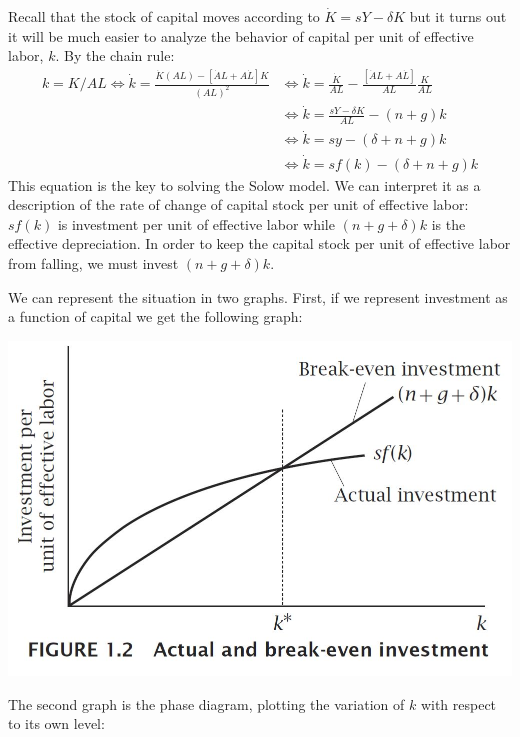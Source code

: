 \documentclass[12pt]{report}
\begin{document}
Recall that the stock of capital moves according to $\dot{K} = sY - \delta K$ but it turns out it will be much easier to analyze the behavior of capital per unit of effective labor, $k$. By the chain rule: \begin{align*} k = K/AL \Leftrightarrow \dot{k} =  \frac{\dot{K}(AL) - [\dot{A}L + A\dot{L}]K}{(AL)^2} & \Leftrightarrow \dot{k}  =  \frac{\dot{K}}{AL} - \frac{[\dot{A}L + A\dot{L}]}{AL}\frac{K}{AL} \\
& \Leftrightarrow \dot{k}  =  \frac{sY - \delta K}{AL} - (n + g)k \\
& \Leftrightarrow \dot{k}  =  sy - (\delta + n + g)k\\
& \Leftrightarrow \dot{k}  =  sf(k) - (\delta + n + g)k
\end{align*} This equation is the key to solving the Solow model. We can interpret it as a description of the rate of change of capital stock per unit of effective labor: $sf(k)$ is investment per unit of effective labor while $(n+g+\delta)k$ is the effective depreciation. In order to keep the capital stock per unit of effective labor from falling, we must invest $(n+g+\delta)k$.

We can represent the situation in two graphs. First, if we represent investment as a function of capital we get the following graph:\begin{center}
\includegraphics[scale=0.33]{images/Solowbreakeven}
\end{center}

The second graph is the phase diagram, plotting the variation of $k$ with respect to its own level:
 
\end{document}
